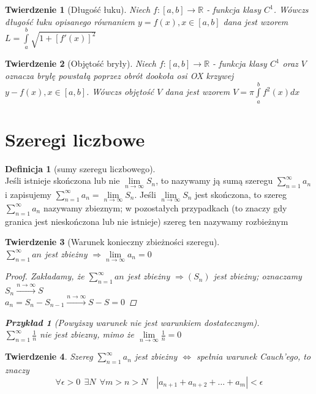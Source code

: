\documentclass[12pt,a4paper]{article}
\newtheorem{tw}{Twierdzenie}
\newtheorem{przyklad}{Przykład}
\theoremstyle{definition}
\newtheorem{df}{Definicja}
\begin{document}
\begin{tw}[Długość łuku]
Niech $f: [a,b] \to \mathbb{R}$ - funkcja klasy $C^1$. Wówczs długość łuku opisanego równaniem $y=f(x), x\in [a,b]$ dana jest wzorem $L = \int\limits_a^b \sqrt{1 + \left[f'(x)\right]^2}$
\end{tw}

\begin{tw}[Objętość bryły]
Niech $f: [a,b] \to \mathbb{R}$ - funkcja klasy $C^1$ oraz $V$ oznacza bryłę powstałą poprzez obrót dookoła osi OX krzywej $y - f(x), x\in [a,b]$. Wówczs objętość $V$ dana jest wzorem $V = \pi\int\limits_a^b f^2(x)dx$
\end{tw}


\section{Szeregi liczbowe}

\begin{df}[sumy szeregu liczbowego]~\\
Jeśli istnieje skończona lub nie $\lim\limits_{n\to\infty}S_n$, to nazywamy ją sumą szeregu $\sum\limits_{n=1}^\infty a_n$ i zapisujemy $\sum\limits_{n=1}^\infty a_n=\lim\limits_{n\to\infty}S_n$.
Jeśli $\lim\limits_{n\to\infty}S_n$ jest skończona, to szereg $\sum\limits_{n=1}^\infty a_n$ nazywamy zbieznym; w pozostałych przypadkach (to znaczy gdy granica jest nieskończona lub nie istnieje) szereg ten nazywamy rozbieżnym
\end{df}

\begin{tw}[Warunek konieczny zbieżności szeregu]~\\
$\sum\limits_{n=1}^\infty an$ jest zbieżny $\Rightarrow \lim\limits_{n\to\infty}a_n = 0$
\begin{proof}
Zakładamy, że $\sum\limits_{n=1}^\infty an$ jest zbieżny $\Rightarrow (S_n)$ jest zbieżny; oznaczamy 
$S_n \xrightarrow{n\to\infty} S$\\
$a_n = S_n - S_{n-1} \xrightarrow{n\to\infty} S - S = 0$ 
\end{proof}
\begin{przyklad}[Powyższy warunek nie jest warunkiem dostatecznym]~\\
$\sum\limits_{n=1}^\infty \frac{1}{n}$ nie jest zbiezny, mimo że $\lim\limits_{n\to\infty} \frac{1}{n} = 0$
\end{przyklad}
\end{tw}

\begin{tw}
Szereg $\sum\limits_{n=1}^\infty a_n$ jest zbieżny $\Leftrightarrow$ spełnia warunek Cauch'ego, to znaczy
$$
\forall \epsilon > 0 ~~\exists N ~~\forall m > n > N \quad |a_{n+1} + a_{n+2} + \dots + a_m| < \epsilon
$$
\end{tw}
\end{document}
